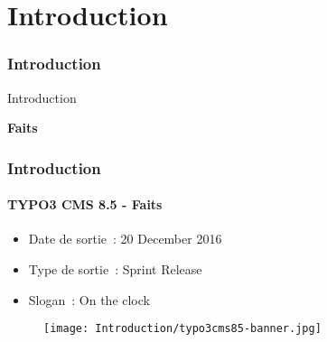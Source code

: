 %

\section{Introduction}
\begin{frame}[fragile]
	\frametitle{Introduction}

	\begin{center}\huge{Introduction}\end{center}
	\begin{center}\huge{\color{typo3darkgrey}\textbf{Faits}}\end{center}

\end{frame}

\begin{frame}[fragile]
	\frametitle{Introduction}
	\framesubtitle{TYPO3 CMS 8.5 - Faits}

	\begin{itemize}
		\item Date de sortie~: 20 December 2016
		\item Type de sortie~: Sprint Release
		\item Slogan~: On the clock
	\end{itemize}

	\begin{figure}
		\texttt{[image: Introduction/typo3cms85-banner.jpg]}
	\end{figure}

\end{frame}

